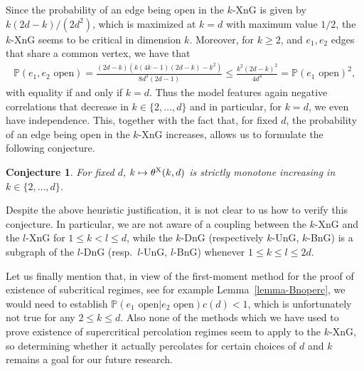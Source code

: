 \documentclass[a4paper, oneside, 11pt]{amsart}
\newtheorem{conj}[theorem]{Conjecture}
\theoremstyle{definition}
\renewcommand{\P}{\mathbb{P}}
\newcommand{\1}{\mathbbm{1}}
\newcommand{\0}{\mathbf{o}}
\newcommand*{\be}{\begin{equation}}
\newcommand*{\ee}{\end{equation}}
\newcommand*{\ba}{\begin{aligned}}
\newcommand*{\ea}{\end{aligned}}
\numberwithin{equation}{section}
\begin{document}
Since the probability of an edge being open 
in the $k$-XnG is given by $k(2d-k)/(2d^2)$, which is maximized at $k=d$ with maximum value $1/2$, the $k$-XnG seems to be critical in dimension $k$. Moreover, for $k\ge 2$, and $e_1, e_2$ edges that share a common vertex, we have that 
\be\ba 
\P(e_1,e_2\text{ open})=\frac{(2d-k)(k(4k-1)(2d-k)-k^2)}{8d^3(2d-1)}\leq \frac{k^2(2d-k)^2}{4d^4}=\P(e_1\text{ open})^2,
\ea \ee
with equality if and only if $k=d$. Thus the model features again negative correlations that decrease in $k\in\{2,\dots,d\}$ and in particular, for $k=d$, we even have independence. This, together with the fact that, for fixed $d$, the probability of an edge being open in the $k$-XnG increases, allows us to formulate the following conjecture.
\begin{conj}
For fixed $d$, $k \mapsto \theta^{\rm X}(k,d)$ is strictly monotone increasing in $k\in\{2,\dots,d\}$.
\end{conj}
Despite the above heuristic justification, it is not clear to us how to verify this conjecture. In particular, we are not aware of a coupling between the $k$-XnG and the $l$-XnG for $1 \leq k < l \leq d$, while the $k$-DnG (respectively $k$-UnG, $k$-BnG) is a subgraph of the $l$-DnG (resp.\ $l$-UnG, $l$-BnG) whenever $1 \leq k \leq l \leq 2d$.

Let us finally mention that, in view of the first-moment method for the proof of existence of subcritical regimes, see for example Lemma~\ref{lemma-Bnoperc}, we would need to establish $\P(e_1\text{ open}|e_2\text{ open})c(d)<1$, which is unfortunately not true for any $2\le k\le d$. Also none of the methods which we have used to prove existence of supercritical percolation regimes seem to apply to the $k$-XnG, so determining whether it actually percolates for certain choices of $d$ and $k$ remains a goal for our future research. 
\end{document}
